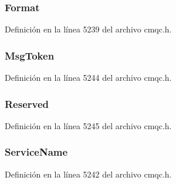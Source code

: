 \subsubsection[{Format}]{ Format}\label{structtag_m_q_w_i_h_a435a478822008713f8aaff89f369ed63}


Definición en la línea 5239 del archivo cmqc.\+h.

\hypertarget{structtag_m_q_w_i_h_a7a9f6d7dcb4ca77398c126fa4101733d}{}
\subsubsection[{Msg\+Token}]{ Msg\+Token}\label{structtag_m_q_w_i_h_a7a9f6d7dcb4ca77398c126fa4101733d}


Definición en la línea 5244 del archivo cmqc.\+h.

\hypertarget{structtag_m_q_w_i_h_a0b58bef81b9a04641b8939833aaa81ae}{}
\subsubsection[{Reserved}]{ Reserved}\label{structtag_m_q_w_i_h_a0b58bef81b9a04641b8939833aaa81ae}


Definición en la línea 5245 del archivo cmqc.\+h.

\hypertarget{structtag_m_q_w_i_h_abb17f696a4e8c5d156821d23b0f50e84}{}
\subsubsection[{Service\+Name}]{ Service\+Name}\label{structtag_m_q_w_i_h_abb17f696a4e8c5d156821d23b0f50e84}


Definición en la línea 5242 del archivo cmqc.\+h.

\hypertarget{structtag_m_q_w_i_h_a6374b5b4fad2f2a335b40c1eb8d523dc}{}
